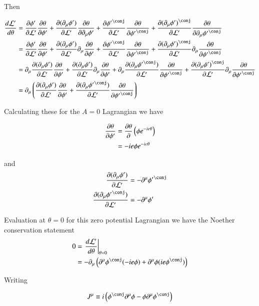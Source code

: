 \documentclass{article}
\begin{document}
Then 

\begin{align*}
\frac{d\LL'}{d\theta} 
&=
\PD{\phi'}{\LL'} \PD{\theta}{\phi'} 
+\PD{(\partial_\mu \phi')}{\LL'} \PD{\theta}{\partial_\mu \phi'}
+\PD{{\phi'}^\conj}{\LL'} \PD{\theta}{{\phi'}^\conj}
+\PD{(\partial_\mu {\phi')}^\conj}{\LL'} \PD{\theta}{\partial_\mu {\phi'}^\conj} \\
&=
\PD{\phi'}{\LL'} \PD{\theta}{\phi'} 
+\PD{(\partial_\mu \phi')}{\LL'} \partial_\mu \PD{\theta}{\phi'}
+\PD{{\phi'}^\conj}{\LL'} \PD{\theta}{{\phi'}^\conj}
+\PD{(\partial_\mu {\phi')}^\conj}{\LL'} \partial_\mu \PD{\theta}{{\phi'}^\conj} \\
&=
\partial_\mu \PD{(\partial_\mu \phi')}{\LL'} 
\PD{\theta}{\phi'} 
+\PD{(\partial_\mu \phi')}{\LL'} \partial_\mu \PD{\theta}{\phi'}
+
\partial_\mu \PD{(\partial_\mu {\phi'}^\conj)}{\LL'} 
\PD{\theta}{{\phi'}^\conj}
+\PD{(\partial_\mu {\phi')}^\conj}{\LL'} \partial_\mu \PD{\theta}{{\phi'}^\conj} \\
&=
\partial_\mu \left( 
\PD{(\partial_\mu \phi')}{\LL'} \PD{\theta}{\phi'} 
+
\PD{(\partial_\mu {\phi'}^\conj)}{\LL'} \PD{\theta}{{\phi'}^\conj}
\right)
\end{align*}

Calculating these for the $A=0$ Lagrangian we have

\begin{align*}
\frac{\partial{\theta}}{\partial {\phi'}} 
&= \frac{\partial{\theta}}{\partial {}} \left( \phi e^{-i e \theta} \right) \\
&= -i e \phi e^{-i e \theta} \\
\end{align*}

and
\begin{align*}
\PD{(\partial_\mu \phi')}{\LL'} &= - \partial^\mu {\phi'}^\conj \\
\PD{(\partial_\mu {\phi'}^\conj)}{\LL'} &= - \partial^\mu \phi' \\
\end{align*}

Evaluation at $\theta=0$ for this zero potential Lagrangian we have the Noether conservation statement
\begin{align*}
0 
&=
\left. \frac{d\LL'}{d\theta} \right\vert_{\theta=0} \\
&=
-\partial_\mu \left( \partial^\mu \phi^\conj (-i e \phi ) + \partial^\mu \phi (i e \phi^\conj ) \right)
\end{align*}

Writing

\begin{align}
J^\mu \equiv i \left( \phi^\conj \partial^\mu \phi - \phi \partial^\mu \phi^\conj \right)
\end{align}
\end{document}
